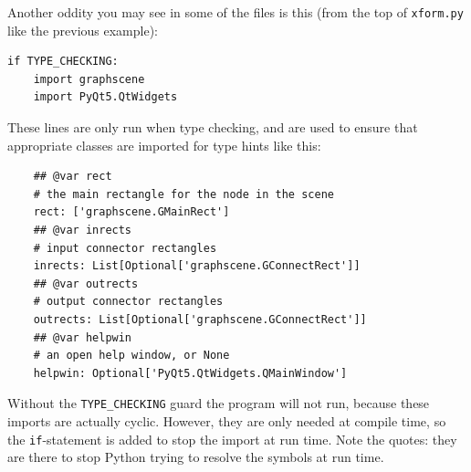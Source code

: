 Another oddity you may see in some of the files is this (from the top
of \texttt{xform.py} like the previous example):
\begin{lstlisting}
if TYPE_CHECKING:
    import graphscene
    import PyQt5.QtWidgets
\end{lstlisting}
These lines are only run when type checking, and are used to ensure
that appropriate classes are imported for type hints like this:
\begin{lstlisting}
    ## @var rect
    # the main rectangle for the node in the scene
    rect: ['graphscene.GMainRect']
    ## @var inrects
    # input connector rectangles
    inrects: List[Optional['graphscene.GConnectRect']]
    ## @var outrects
    # output connector rectangles
    outrects: List[Optional['graphscene.GConnectRect']]
    ## @var helpwin
    # an open help window, or None
    helpwin: Optional['PyQt5.QtWidgets.QMainWindow']
\end{lstlisting}
Without the \texttt{TYPE\_CHECKING} guard the program will not run, because
these imports are actually cyclic. However, they are only needed at 
compile time, so the \texttt{if}-statement is added to stop the import
at run time. Note the quotes: they are there to stop Python trying to
resolve the symbols at run time.

